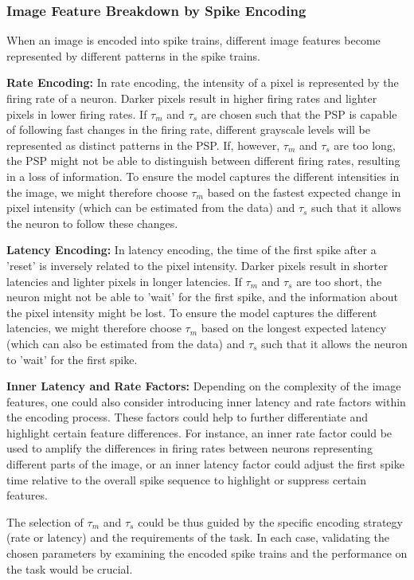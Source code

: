 \subsubsection{Image Feature Breakdown by Spike Encoding}

When an image is encoded into spike trains, different image features become represented by different patterns in the spike trains.

\textbf{Rate Encoding:} In rate encoding, the intensity of a pixel is represented by the firing rate of a neuron. Darker pixels result in higher firing rates and lighter pixels in lower firing rates. If $\tau_m$ and $\tau_s$ are chosen such that the PSP is capable of following fast changes in the firing rate, different grayscale levels will be represented as distinct patterns in the PSP. If, however, $\tau_m$ and $\tau_s$ are too long, the PSP might not be able to distinguish between different firing rates, resulting in a loss of information. To ensure the model captures the different intensities in the image, we might therefore choose $\tau_m$ based on the fastest expected change in pixel intensity (which can be estimated from the data) and $\tau_s$ such that it allows the neuron to follow these changes.

\textbf{Latency Encoding:} In latency encoding, the time of the first spike after a 'reset' is inversely related to the pixel intensity. Darker pixels result in shorter latencies and lighter pixels in longer latencies. If $\tau_m$ and $\tau_s$ are too short, the neuron might not be able to 'wait' for the first spike, and the information about the pixel intensity might be lost. To ensure the model captures the different latencies, we might therefore choose $\tau_m$ based on the longest expected latency (which can also be estimated from the data) and $\tau_s$ such that it allows the neuron to 'wait' for the first spike.

\textbf{Inner Latency and Rate Factors:} Depending on the complexity of the image features, one could also consider introducing inner latency and rate factors within the encoding process. These factors could help to further differentiate and highlight certain feature differences. For instance, an inner rate factor could be used to amplify the differences in firing rates between neurons representing different parts of the image, or an inner latency factor could adjust the first spike time relative to the overall spike sequence to highlight or suppress certain features.

The selection of $\tau_m$ and $\tau_s$ could be thus guided by the specific encoding strategy (rate or latency) and the requirements of the task. In each case, validating the chosen parameters by examining the encoded spike trains and the performance on the task would be crucial.


